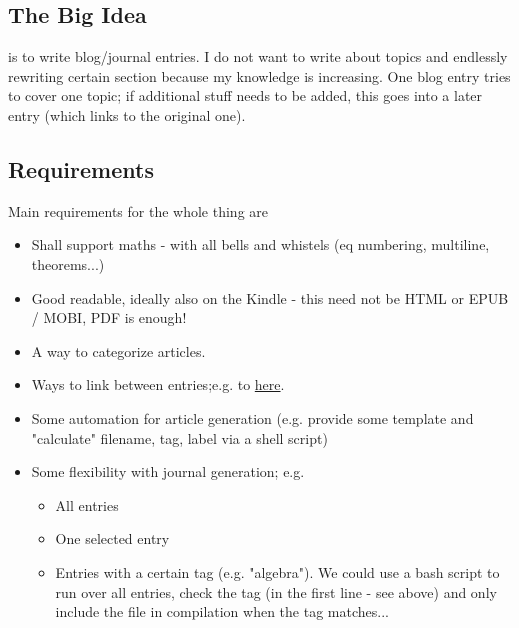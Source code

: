 
\subsection*{The Big Idea}

is to write blog/journal entries. I do not want to write about topics and endlessly rewriting certain section because my knowledge is increasing. One blog entry tries to cover one topic; if additional stuff needs to be added, this goes into a later entry (which links to the original one).

\subsection*{Requirements}

Main requirements for the whole thing are

\begin{itemize}

\item Shall support maths - with all bells and whistels (eq numbering, multiline, theorems...)

\item Good readable, ideally also on the Kindle - this need not be HTML or EPUB / MOBI, PDF is enough!

\item A way to categorize articles.

\item Ways to link between entries;e.g. to \hyperref[2017-01-08:entry]{here}.

\item Some automation for article generation (e.g. provide some template and "calculate" filename, tag, label via a shell script)

\item Some flexibility with journal generation; e.g.

\begin{itemize}

\item All entries

\item One selected entry

\item Entries with a certain tag (e.g. "algebra"). We could use a bash script to run over all entries, check the tag (in the first line - see above) and only include the file in compilation when the tag matches...

\end{itemize}

\end{itemize}

